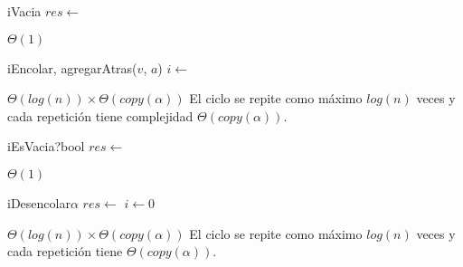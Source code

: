 \begin{Algoritmos}


  \begin{algoritmo}{iVacia}{}{}
    $res \gets$ \vacio{} 
  \end{algoritmo}
  \datosAlgoritmo{} %
  {} %
  {} %
  {$\Theta(1)$} %
  {} %

  \begin{algoritmo}{iEncolar}{, }{}
    agregarAtras($v$, $a$) 
     $i \gets$  
  \end{algoritmo}
  \datosAlgoritmo{} %
  {} %
  {} %
  {$\Theta(log(n)) \times \Theta(copy(\alpha))$} %
  {El ciclo se repite como m\'aximo $log(n)$ veces y cada repetici\'on tiene complejidad $\Theta(copy(\alpha))$. } %

  \begin{algoritmo}{iEsVacia?}{}{bool}
    $res \gets$  
  \end{algoritmo}
  \datosAlgoritmo{} %
  {} %
  {} %
  {$\Theta(1)$} %
  {} %

  \begin{algoritmo}{iDesencolar}{}{$\alpha$}
    $res \gets$  
     $i \gets 0$ 
  \end{algoritmo}
  \datosAlgoritmo{} %
  {} %
  {} %
  {$\Theta(log(n)) \times \Theta(copy(\alpha))$} %
  {El ciclo se repite como m\'aximo $log(n)$ veces y cada repetici\'on tiene $\Theta(copy(\alpha))$. } %


\end{Algoritmos}
